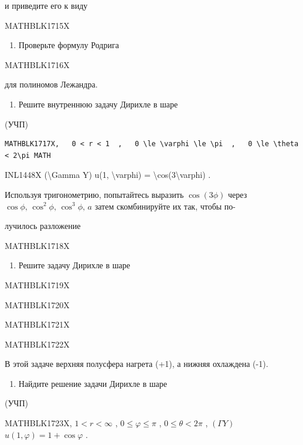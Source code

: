\documentclass[
]{article}
\providecommand{\tightlist}{%
  \setlength{\itemsep}{0pt}\setlength{\parskip}{0pt}}
\begin{document}
и приведите его к виду

MATHBLK1715X

\begin{enumerate}
\def\labelenumi{\arabic{enumi}.}
\setcounter{enumi}{2}
\tightlist
\item
  Проверьте формулу Родрига
\end{enumerate}

MATHBLK1716X

для полиномов Лежандра.

\begin{enumerate}
\def\labelenumi{\arabic{enumi}.}
\setcounter{enumi}{3}
\tightlist
\item
  Решите внутреннюю задачу Дирихле в шаре
\end{enumerate}

(УЧП)

\begin{verbatim}
MATHBLK1717X,   0 < r < 1  ,   0 \le \varphi \le \pi  ,   0 \le \theta < 2\pi MATH
\end{verbatim}

INL1448X (\textbackslash Gamma Y) u(1, \textbackslash varphi) =
\textbackslash cos(3\textbackslash varphi) .

Используя тригонометрию, попытайтесь выразить \(\cos{(3\phi)}\) через
\(\cos{\phi}, \, \cos^2{\phi}, \, \cos^3{\phi}, \, a\) затем
скомбинируйте их так, чтобы по-

лучилось разложение

MATHBLK1718X

\begin{enumerate}
\def\labelenumi{\arabic{enumi}.}
\setcounter{enumi}{4}
\tightlist
\item
  Решите задачу Дирихле в шаре
\end{enumerate}

MATHBLK1719X

MATHBLK1720X

MATHBLK1721X

MATHBLK1722X

В этой задаче верхняя полусфера нагрета (+1), а нижняя охлаждена (-1).

\begin{enumerate}
\def\labelenumi{\arabic{enumi}.}
\setcounter{enumi}{5}
\tightlist
\item
  Найдите решение задачи Дирихле в шаре
\end{enumerate}

(УЧП)

MATHBLK1723X, \(1 < r < \infty\) , \(0 \le \varphi \le \pi\) ,
\(0 \le \theta < 2\pi\) , \((\Gamma Y)\)
\(u(1, \varphi) = 1 + \cos \varphi\) .
\end{document}
